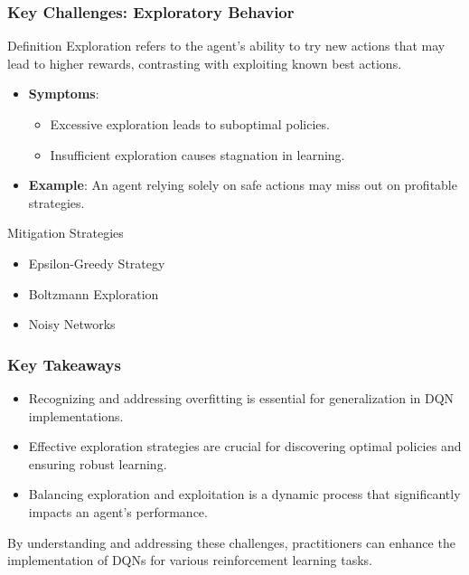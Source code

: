 \documentclass{beamer}
\begin{document}
\begin{frame}[fragile]
    \frametitle{Key Challenges: Exploratory Behavior}
    \begin{block}{Definition}
        Exploration refers to the agent's ability to try new actions that may lead to higher rewards, contrasting with exploiting known best actions.
    \end{block}
    \begin{itemize}
        \item \textbf{Symptoms}:
        \begin{itemize}
            \item Excessive exploration leads to suboptimal policies.
            \item Insufficient exploration causes stagnation in learning.
        \end{itemize}
        \item \textbf{Example}: An agent relying solely on safe actions may miss out on profitable strategies.
    \end{itemize}
    
    \begin{block}{Mitigation Strategies}
        \begin{itemize}
            \item Epsilon-Greedy Strategy
            \item Boltzmann Exploration
            \item Noisy Networks
        \end{itemize}
    \end{block}
\end{frame}

\begin{frame}[fragile]
    \frametitle{Key Takeaways}
    \begin{itemize}
        \item Recognizing and addressing overfitting is essential for generalization in DQN implementations.
        \item Effective exploration strategies are crucial for discovering optimal policies and ensuring robust learning.
        \item Balancing exploration and exploitation is a dynamic process that significantly impacts an agent's performance.
    \end{itemize}
    By understanding and addressing these challenges, practitioners can enhance the implementation of DQNs for various reinforcement learning tasks.
\end{frame}
\end{document}
